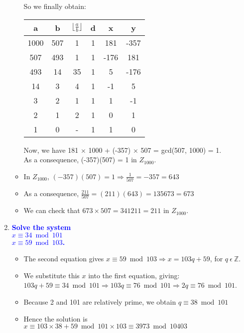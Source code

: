 \documentclass[11pt]{article}
\begin{document}
\begin{enumerate}
\begin{itemize}
\begin{center}
            \end{center}
            So we finally obtain: \\
            \begin{center}
            \begin{tabular}{| c | c | c | c | c | c |} 
            \hline
            a & b & ${\lfloor}\frac{a}{b}{\rfloor}$ & d & x & y \\
            \hline
            1000 & 507 & 1 & 1 & 181 & -357 \\
            507 & 493 & 1 & 1 & -176 & 181 \\
            493 & 14 & 35 & 1 & 5 & -176 \\
            14 & 3 & 4 & 1 & -1 & 5 \\
            3 & 2 & 1 & 1 & 1 & -1 \\
            2 & 1 & 2 & 1 & 0 & 1 \\
            1 & 0 & - & 1 & 1 & 0 \\
            \hline
            \end{tabular}
            \end{center}
            Now, we have 181 $\times$ 1000 + (-357) $\times$ 507 = gcd(507, 1000) = 1.
            \\ As a consequence, (-357)(507) = 1 in $Z_{1000}$.
        \item In $Z_{1000}$, $(-357)(507) = 1 \Rightarrow \frac{1}{507} = -357 = 643$
        \item As a consequence, $\frac{211}{507} = (211)(643) = 135673 = 673$
        \item We can check that $673 \times 507 = 341211 = 211$ in $Z_{1000}$.
    \end{itemize}

    

\item \textbf{\textcolor{blue}{Solve the system \\ $x\equiv 34 \bmod{101}$\\ $x\equiv 59 \bmod{103}$.}}
    \begin{itemize}
        \item The second equation gives $x \equiv 59 \bmod{103} \Rightarrow x = 103q + 59$, for $q\ \epsilon\ \mathbb{Z}$.
        \item We substitute this $x$ into the first equation, giving: $103q + 59 \equiv 34 \bmod{101} \Rightarrow 103q \equiv 76 \bmod{101} \Rightarrow 2q \equiv 76 \bmod{101}$.
        \item Because 2 and 101 are relatively prime, we obtain $q \equiv 38 \bmod{101}$
        \item Hence the solution is $x \equiv 103 \times 38 + 59 \bmod{101 \times 103} \equiv 3973 \bmod{10403}$
    \end{itemize}


\end{enumerate}
\end{document}
